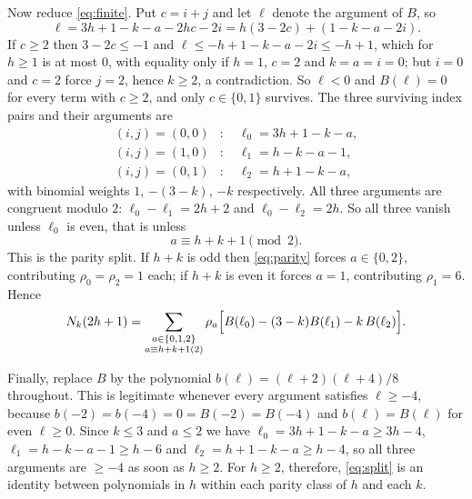 \documentclass[11pt]{amsart}
\theoremstyle{definition}
\theoremstyle{remark}
\begin{document}
Now reduce \cref{eq:finite}. Put $c = i+j$ and let $\ell$ denote the argument of $B$, so
\[
\ell = 3h+1-k-a-2h c - 2i = h(3-2c) + (1-k-a-2i).
\]
If $c \ge 2$ then $3-2c \le -1$ and $\ell \le -h + 1 - k - a - 2i \le -h+1$, which for $h \ge 1$ is at most $0$, with equality only if $h=1$, $c=2$ and $k=a=i=0$; but $i=0$ and $c=2$ force $j=2$, hence $k \ge 2$, a contradiction. So $\ell < 0$ and $B(\ell) = 0$ for every term with $c \ge 2$, and only $c \in \{0,1\}$ survives. The three surviving index pairs and their arguments are
\[
\begin{aligned}
(i,j) = (0,0) &: \quad \ell_0 = 3h+1-k-a,\\
(i,j) = (1,0) &: \quad \ell_1 = h-k-a-1,\\
(i,j) = (0,1) &: \quad \ell_2 = h+1-k-a,
\end{aligned}
\]
with binomial weights $1$, $-(3-k)$, $-k$ respectively. All three arguments are congruent modulo $2$: $\ell_0 - \ell_1 = 2h+2$ and $\ell_0 - \ell_2 = 2h$. So all three vanish unless $\ell_0$ is even, that is unless
\begin{equation}
a \equiv h+k+1 \pmod 2 .
\label{eq:parity}
\end{equation}
This is the parity split. If $h+k$ is odd then \cref{eq:parity} forces $a \in \{0,2\}$, contributing $\rho_0 = \rho_2 = 1$ each; if $h+k$ is even it forces $a = 1$, contributing $\rho_1 = 6$. Hence
\begin{equation}
N_k(2h+1) = \sum_{\substack{a \in \{0,1,2\}\\ a \equiv h+k+1 (2)}} \rho_a
\Bigl[ B(\ell_0) - (3-k)B(\ell_1) - k\,B(\ell_2) \Bigr].
\label{eq:split}
\end{equation}

Finally, replace $B$ by the polynomial $b(\ell) = (\ell+2)(\ell+4)/8$ throughout. This is legitimate whenever every argument satisfies $\ell \ge -4$, because $b(-2) = b(-4) = 0 = B(-2) = B(-4)$ and $b(\ell) = B(\ell)$ for even $\ell \ge 0$. Since $k \le 3$ and $a \le 2$ we have $\ell_0 = 3h+1-k-a \ge 3h-4$, $\ell_1 = h-k-a-1 \ge h-6$ and $\ell_2 = h+1-k-a \ge h-4$, so all three arguments are $\ge -4$ as soon as $h \ge 2$. For $h \ge 2$, therefore, \cref{eq:split} is an identity between polynomials in $h$ within each parity class of $h$ and each $k$.
\end{document}

